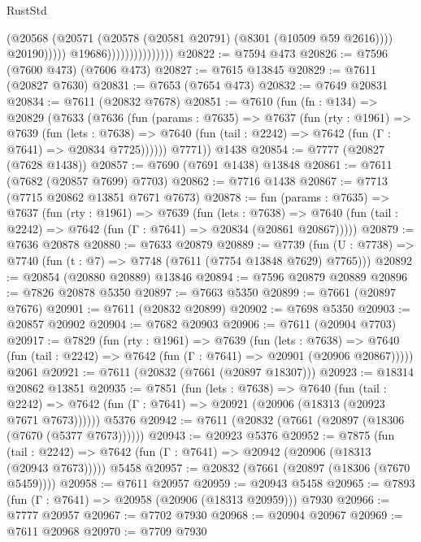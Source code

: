 \begin{lexlean}{RustStd}
\begin{coremodule}
                                          (@20568
                                            (@20571
                                              (@20578 (@20581 @20791) (@8301 (@10509 @59 @2616))))
                                            @20190)))))
                                  @19686)))))))))))))))
@20822 := @7594 @473
@20826 := @7596 (@7600 @473) (@7606 @473)
@20827 := @7615 @13845
@20829 := @7611 (@20827 @7630)
@20831 := @7653 (@7654 @473)
@20832 := @7649 @20831
@20834 := @7611 (@20832 @7678)
@20851 := @7610
    (fun (fn : @134) =>
    @20829
      (@7633
        (@7636
          (fun (params : @7635) =>
          @7637
            (fun (rty : @1961) =>
            @7639
              (fun (lets : @7638) =>
              @7640 (fun (tail : @2242) => @7642 (fun (Γ : @7641) => @20834 @7725))))))
        @7771))
    @1438
@20854 := @7777 (@20827 (@7628 @1438))
@20857 := @7690 (@7691 @1438) @13848
@20861 := @7611 (@7682 (@20857 @7699) @7703)
@20862 := @7716 @1438
@20867 := @7713 (@7715 @20862 @13851 @7671 @7673)
@20878 := fun (params : @7635) =>
  @7637
    (fun (rty : @1961) =>
    @7639
      (fun (lets : @7638) =>
      @7640 (fun (tail : @2242) => @7642 (fun (Γ : @7641) => @20834 (@20861 @20867)))))
@20879 := @7636 @20878
@20880 := @7633 @20879
@20889 := @7739
    (fun (U : @7738) => @7740 (fun (t : @7) => @7748 (@7611 (@7754 @13848 @7629) @7765)))
@20892 := @20854 (@20880 @20889) @13846
@20894 := @7596 @20879 @20889
@20896 := @7826 @20878 @5350
@20897 := @7663 @5350
@20899 := @7661 (@20897 @7676)
@20901 := @7611 (@20832 @20899)
@20902 := @7698 @5350
@20903 := @20857 @20902
@20904 := @7682 @20903
@20906 := @7611 (@20904 @7703)
@20917 := @7829
    (fun (rty : @1961) =>
    @7639
      (fun (lets : @7638) =>
      @7640 (fun (tail : @2242) => @7642 (fun (Γ : @7641) => @20901 (@20906 @20867)))))
    @2061
@20921 := @7611 (@20832 (@7661 (@20897 @18307)))
@20923 := @18314 @20862 @13851
@20935 := @7851
    (fun (lets : @7638) =>
    @7640
      (fun (tail : @2242) =>
      @7642 (fun (Γ : @7641) => @20921 (@20906 (@18313 (@20923 @7671 @7673))))))
    @5376
@20942 := @7611 (@20832 (@7661 (@20897 (@18306 (@7670 (@5377 @7673))))))
@20943 := @20923 @5376
@20952 := @7875
    (fun (tail : @2242) => @7642 (fun (Γ : @7641) => @20942 (@20906 (@18313 (@20943 @7673)))))
    @5458
@20957 := @20832 (@7661 (@20897 (@18306 (@7670 @5459))))
@20958 := @7611 @20957
@20959 := @20943 @5458
@20965 := @7893 (fun (Γ : @7641) => @20958 (@20906 (@18313 @20959))) @7930
@20966 := @7777 @20957
@20967 := @7702 @7930
@20968 := @20904 @20967
@20969 := @7611 @20968
@20970 := @7709 @7930

\end{coremodule}
\end{lexlean}
